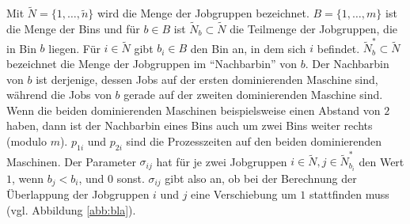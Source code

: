 \documentclass{scrreprt}
\begin{document}
Mit $\tilde{N}=\{1,\ldots,\tilde{n}\}$ wird die Menge der Jobgruppen bezeichnet.
$B=\{1,\ldots,m\}$ ist die Menge der Bins und für $b\in B$ ist $\tilde{N}_b\subset \tilde{N}$ die Teilmenge der Jobgruppen, die in Bin $b$ liegen.
Für $i\in\tilde{N}$ gibt $b_i\in B$ den Bin an, in dem sich $i$ befindet.
$\tilde{N}_b^*\subset \tilde{N}$ bezeichnet die Menge der Jobgruppen im "`Nachbarbin"' von $b$.
Der Nachbarbin von $b$ ist derjenige, dessen Jobs auf der ersten dominierenden Maschine sind, während die Jobs von $b$ gerade auf der zweiten dominierenden Maschine sind.
Wenn die beiden dominierenden Maschinen beispielsweise einen Abstand von $2$ haben, dann ist der Nachbarbin eines Bins auch um zwei Bins weiter rechts (modulo $m$).
$p_{1i}$ und $p_{2i}$ sind die Prozesszeiten auf den beiden dominierenden Maschinen.
Der Parameter $\sigma_{ij}$ hat für je zwei Jobgruppen $i\in\tilde{N},j\in\tilde{N}^*_{b_i}$ den Wert $1$, wenn $b_j<b_i$, und $0$ sonst.
$\sigma_{ij}$ gibt also an, ob bei der Berechnung der Überlappung der Jobgruppen $i$ und $j$ eine Verschiebung um $1$ stattfinden muss (vgl. Abbildung \ref{abb:bla}).
\end{document}
